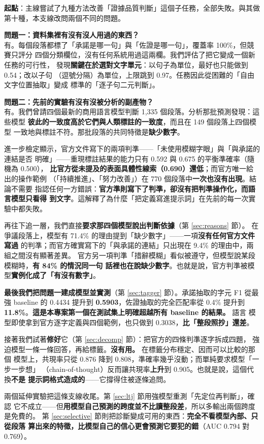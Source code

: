 \documentclass[11pt,a4paper]{ctexart}
\begin{document}
\begin{tcolorbox}[colback=blue!5, colframe=blue!50, title=一頁摘要：這條支線做了什麼]
\textbf{起點}：主線嘗試了九種方法改善「證據品質判斷」這個子任務，全部失敗。與其做
第十種，本支線改問兩個不同的問題。

\medskip
\textbf{問題一：資料集裡有沒有沒人用過的東西？}\\
有。每個段落都標了「承諾是哪一句」與「佐證是哪一句」，覆蓋率 100\%，但競賽只評分
四個分類欄位，沒有任何系統用過這兩欄。我們評估了把它變成一個新任務的可行性，
發現\textbf{關鍵在於選對文字單元}：以句子為單位，最好也只能做到 0.54；改以子句
（逗號分隔）為單位，上限跳到 0.97。任務因此從困難的「自由文字位置抽取」變成
標準的「逐子句二元判斷」。

\medskip
\textbf{問題二：先前的實驗有沒有沒被分析的副產物？}\\
有。我們曾請四個最新的商用語言模型判斷 1{,}335 個段落。分析那批預測發現：這些模型
\textbf{彼此的一致度高於它們與人類標註的一致度}，而且在 149 個段落上四個模型
一致地與標註不符。那批段落的共同特徵是\textbf{缺少數字}。

\medskip
進一步檢定顯示，官方文件寫下的兩項判準——「未使用模糊字眼」與「與承諾的連結是否
明確」——重現標註結果的能力只有 0.592 與 0.675 的平衡準確率（隨機為 0.500），
\textbf{比官方從未提及的表面具體性線索（0.690）還低}；而官方唯一給出的操作範例
（「持續推進」、「努力改善」）在 770 個段落中\textbf{一次也沒有出現}。結論不需要
指認任何一方錯誤：\textbf{官方準則寫下了判準，卻沒有把判準操作化，而語言模型只看得
到文字}。這解釋了為什麼「把定義寫進提示詞」在先前的每一次實驗中都失敗。

\medskip
再往下追一層，我們直接\textbf{要求那四個模型說出判斷依據}（第 \ref{sec:reasons} 節）。
在爭議段落上，模型有 71.4\% 的理由提到「缺少數字」——一項\textbf{沒有任何官方文件寫過}
的判準；而官方確實寫下的「與承諾的連結」只出現在 9.4\% 的理由中，兩組之間沒有顯著差異。
官方另一項判準「措辭模糊」看似被遵守，但模型說某段模糊時，\textbf{有 84\% 的情況同一句
話裡也在說缺少數字}。也就是說，官方判準被模型\textbf{實例化成了「有沒有數字」}。

\medskip
\textbf{最後我們把問題一建成模型並實測}（第 \ref{sec:tagger} 節）。承諾抽取的字元
F1 從最強 baseline 的 0.4434 提升到 \textbf{0.5903}，佐證抽取的完全匹配率從 0.4\% 提升到
\textbf{11.8\%}。\textbf{這是本專案第一個在測試集上明確超越所有 baseline 的結果。} 語言
模型即使拿到官方逐字定義與四個範例，也只做到 0.3038，\textbf{比「整段照抄」還差}。

\medskip
接著我們試著\textbf{修好}它（第 \ref{sec:decomp} 節）：把官方的四條判準逐字拆成四題，
強迫模型一條一條回答，再給標籤。\textbf{沒有用。} 在標籤分布穩定、因而可以比較的那個
模型上，共現率只從 0.876 降到 0.808，準確率幾乎沒動；而單純要求模型「一步一步想」
（chain-of-thought）反而讓共現率\textbf{上升}到 0.905。也就是說，這個代換\textbf{不是
提示詞格式造成的}——它撐得住被逐條追問。

\medskip
兩個延伸實驗把這條支線收尾。第 \ref{sec:ltj} 節用強模型重測「先定位再判斷」，確認
它不成立——但\textbf{用模型自己預測的跨度並不比讀整段差}，所以多輸出兩個跨度是免費的。
第 \ref{sec:selective} 節則把診斷變成可用的東西：\textbf{完全不看模型內部、只從段落
算出來的特徵，比模型自己的信心更會預測它要犯的錯}（AUC 0.794 對 0.769）。
\end{tcolorbox}
\end{document}
